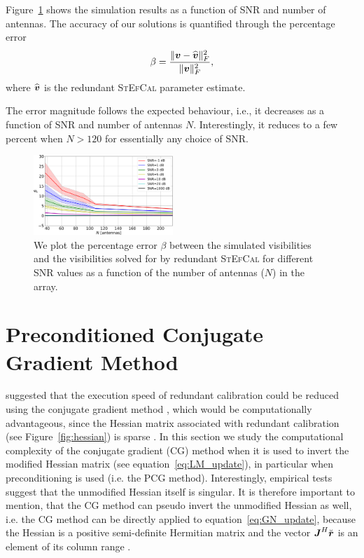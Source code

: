 \documentclass[useAMS,usenatbib]{mn2e}
\newcommand{\br}{\bmath{r}}
\newcommand{\bv}{\bmath{v}}
\newcommand{\bJ}{\bmath{J}}
\begin{document}
Figure~\ref{fig:prec_error} shows the simulation results as a function of SNR and number of antennas. The accuracy of our solutions is quantified through the percentage error
\begin{equation}
\label{eq:beta}
\beta = \frac{\|\bv - \widehat{\bv}\|_F^2}{\|\bv\|_F^2},
\end{equation}
where $\widehat{\bv}$ is the redundant \textsc{StEfCal} parameter estimate.

The error magnitude follows the expected behaviour, i.e., it decreases as a function of SNR and number of antennas $N$. Interestingly, it reduces to a few percent when $N > 120$ for essentially any choice of SNR. 

\begin{figure}
\includegraphics[width=0.47\textwidth]{./prec_error.pdf} 
\caption{We plot the percentage error $\beta$ between the simulated visibilities and the visibilities solved for by redundant \textsc{StEfCal} for different SNR values as a function of the number of antennas ($N$) in the array.}
\label{fig:prec_error}
\end{figure}


\section{Preconditioned Conjugate Gradient Method}
\label{sec:pcg}
\citet{Liu2010} suggested that the execution speed of redundant calibration could be reduced using the 
conjugate gradient method \citep{Hestenes1952}, which would be computationally advantageous, since the Hessian matrix associated 
with redundant calibration (see Figure~\ref{fig:hessian}) is sparse \citep{Reid1971}. In this section we study the computational complexity
of the conjugate gradient (CG) method when it is used to invert the modified Hessian matrix (see equation~\ref{eq:LM_update}), 
in particular when preconditioning is used (i.e. the PCG method). Interestingly, empirical tests suggest that the unmodified Hessian itself is singular. It is therefore important to mention, that the CG method 
can pseudo invert the unmodified Hessian as well, i.e. the CG method can be directly applied to equation~\ref{eq:GN_update}, because the Hessian is a positive semi-definite Hermitian matrix and the vector $\bJ^H\breve{\br}$ is an element of its column range \citep{Lu2015}.
\end{document}
